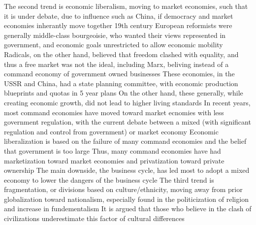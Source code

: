 \documentclass[11 pt, twoside]{article}
\newenvironment{outline*}
{
	\begin{outline}[enumerate]
	}
	{\end{outline}
}
\begin{document}
\begin{outline*}
\1 The second trend is economic liberalism, moving to market economies, such that it is under debate, due to influence such as China, if democracy and market economies inherantly move together
\2 19th century European reformists were generally middle-class bourgeoisie, who wanted their views represented in government, and economic goals unrestricted to allow economic mobility
\2 Radicals, on the other hand, believed that freedom clashed with equality, and thus a free market was not the ideal, including Marx, beliving instead of a command economy of government owned businesses
\3 These economies, in the USSR and China, had a state planning committee, with economic production blueprints and quotas in 5 year plans
\3 On the other hand, these generally, while creating economic growth, did not lead to higher living standards
\2 In recent years, most command economies have moved toward market ecnomies with less government regulation, with the current debate between a mixed (with significant regulation and control from government) or market economy
\2 Economic liberalization is based on the failure of many command economies and the belief that government is too large
\3 Thus, many command economies have had marketization toward market economies and privatization toward private ownership
\3 The main downside, the business cycle, has led most to adopt a mixed economy to lower the dangers of the business cycle
\1 The third trend is fragmentation, or divisions based on culture/ethnicity, moving away from prior globalization toward nationalism, especially found in the politicization of religion and increase in fundementalism
\2 It is argued that those who believe in the clash of civilizations underestimate this factor of cultural differences
\end{outline*}
\end{document}
